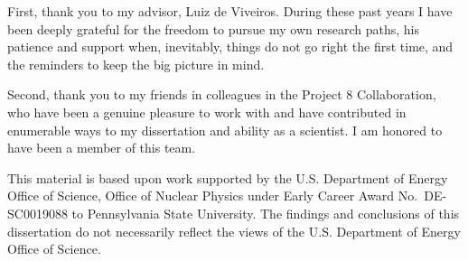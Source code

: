 
First, thank you to my advisor, Luiz de Viveiros. During these past years I have been deeply grateful for the freedom to pursue my own research paths, his patience and support when, inevitably, things do not go right the first time, and the reminders to keep the big picture in mind. 

Second, thank you to my friends in colleagues in the Project 8 Collaboration, who have been a genuine pleasure to work with and have contributed in enumerable ways to my dissertation and ability as a scientist. I am honored to have been a member of this team.

This material is based upon work supported by the U.S. Department of Energy Office of Science, Office of Nuclear Physics under Early Career Award No.~DE-SC0019088 to Pennsylvania State University. The findings and conclusions of this dissertation do not necessarily reflect the views of the U.S. Department of Energy Office of Science.
